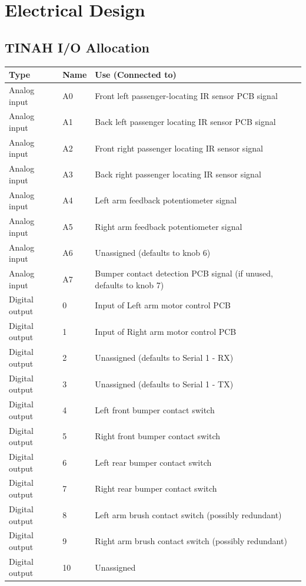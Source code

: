 \documentclass[12pt]{article}
\begin{document}
\section{Electrical Design}
\subsection{TINAH I/O Allocation}
\begin{longtable}{| L{7em} | L{3em} | L{25em} |}
\hline
Type & Name & Use (Connected to) \\
\hline
Analog input & A0 & Front left passenger-locating IR sensor PCB signal \\
\hline
Analog input & A1 & Back left passenger locating IR sensor PCB signal \\
\hline
Analog input & A2 & Front right passenger locating IR sensor signal \\
\hline
Analog input & A3 & Back right passenger locating IR sensor signal \\
\hline
Analog input & A4 & Left arm feedback potentiometer signal \\
\hline
Analog input & A5 & Right arm feedback potentiometer signal \\
\hline
Analog input & A6 & Unassigned (defaults to knob 6) \\
\hline
Analog input & A7 & Bumper contact detection PCB signal (if unused, defaults to knob 7) \\
\hline
Digital output & 0 & Input of Left arm motor control PCB \\
\hline
Digital output & 1 & Input of Right arm motor control PCB \\
\hline
Digital output & 2 & Unassigned (defaults to Serial 1 - RX) \\
\hline
Digital output & 3 & Unassigned (defaults to Serial 1 - TX) \\
\hline
Digital output & 4 & Left front bumper contact switch \\
\hline
Digital output & 5 & Right front bumper contact switch \\
\hline
Digital output & 6 & Left rear bumper contact switch \\
\hline
Digital output & 7 & Right rear bumper contact switch \\
\hline
Digital output & 8 & Left arm brush contact switch (possibly redundant) \\
\hline
Digital output & 9 & Right arm brush contact switch (possibly redundant) \\
\hline
Digital output & 10 & Unassigned \\

\end{longtable}
\end{document}

